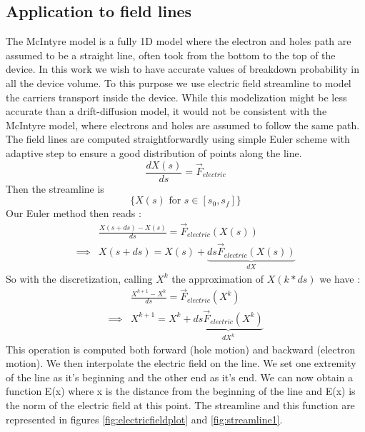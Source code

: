 \documentclass[10pt,a4paper,twocolumn]{article}
\begin{document}
\subsection{Application to field lines}
The McIntyre model is a fully 1D model where the electron and holes path are assumed to be a straight line, often took from the bottom to the top of the device. In this work we wish to have accurate values of breakdown probability in all the device volume. To this purpose we use electric field streamline to model the carriers transport inside the device. While this modelization might be less accurate than a drift-diffusion model, it would not be consistent with the McIntyre model, where electrons and holes are assumed to follow the same path.
The field lines are computed straightforwardly using simple Euler scheme with adaptive step to ensure a good distribution of points along the line.
\begin{equation}
	\frac{dX(s)}{ds} = \vec{F}_{electric}
\end{equation}
Then the streamline is \[ \{X(s) \text{ for } s \in [s_0, s_f]   \} \]
Our Euler method then reads : 
\begin{align}
	&\frac{X(s+ds)-X(s)}{ds} = \vec{F}_{electric}(X(s)) \\
	\implies & X(s+ds) = X(s) + \underbrace{ds\vec{F}_{electric}(X(s))}_{dX}
\end{align}
So with the discretization, calling $X^k$ the approximation of $X(k*ds)$ we have : 
\begin{align}
&\frac{X^{k+1}-X^k}{ds} = \vec{F}_{electric}(X^k) \\
\implies & X^{k+1} = X^k + \underbrace{ds\vec{F}_{electric}(X^k)}_{dX^k}
\end{align}
This operation is computed both forward (hole motion) and backward (electron motion). We then interpolate the electric field on the line. We set one extremity of the line as it's beginning and the other end as it's end. We can now obtain a function E(x) where x is the distance from the beginning of the line and E(x) is the norm of the electric field at this point. The streamline and this function are represented in figures \ref{fig:electricfieldplot} and \ref{fig:streamline1}.
\end{document}

